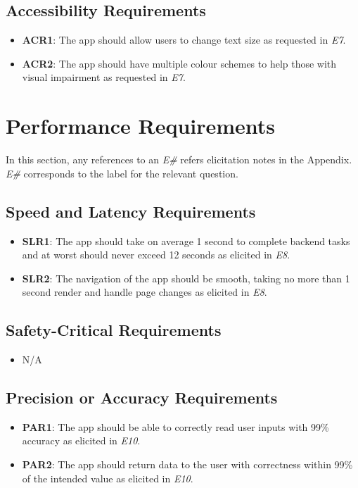 \documentclass[12pt]{article}
\begin{document}
\subsection{Accessibility Requirements}
\begin{itemize}
  \item \textbf{ACR1}: The app should allow users to change text size as requested in \textit{E7}.
  \item \textbf{ACR2}: The app should have multiple colour schemes to help those with visual impairment
  as requested in \textit{E7}.
\end{itemize}

\section{Performance Requirements}
In this section, any references to an \textit{E\#} refers elicitation notes in the Appendix. \textit{E\#} corresponds
to the label for the relevant question.

\subsection{Speed and Latency Requirements}
\begin{itemize}
  \item \textbf{SLR1}: The app should take on average 1 second to complete backend tasks and at worst should never
  exceed 12 seconds as elicited in \textit{E8}.
  \item \textbf{SLR2}: The navigation of the app should be smooth, taking no more than 1 second render and handle page changes
  as elicited in \textit{E8}.
\end{itemize}
\subsection{Safety-Critical Requirements}
\begin{itemize}
  \item N/A
\end{itemize}
\subsection{Precision or Accuracy Requirements}
\begin{itemize}
  \item \textbf{PAR1}: The app should be able to correctly read user inputs with 99\% accuracy as elicited
  in \textit{E10}.
  \item \textbf{PAR2}: The app should return data to the user with correctness within 99\% of the intended value
  as elicited in \textit{E10}.
\end{itemize}
\end{document}
